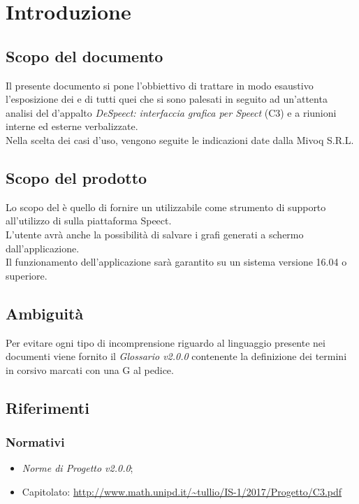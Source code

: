 \documentclass[./AnalisideiRequisiti.tex]{subfiles}
\begin{document}
	
\chapter{Introduzione}
\section{Scopo del documento}
Il presente documento si pone l’obbiettivo di trattare in modo esaustivo l’esposizione dei  e di tutti quei  che si sono palesati in seguito ad un’attenta analisi del  d’appalto \textit{DeSpeect: interfaccia grafica per Speect} (C3) e a riunioni interne ed esterne verbalizzate.
\\ \noindent Nella scelta dei casi d'uso, vengono seguite le indicazioni date dalla  Mivoq S.R.L.

\section{Scopo del prodotto}

Lo scopo del  è quello di fornire un  utilizzabile come strumento di supporto all'utilizzo di  sulla piattaforma Speect. 
\\ \noindent L'utente avrà anche la possibilità di salvare i grafi generati a schermo dall'applicazione.
\\ \noindent Il funzionamento dell'applicazione sarà garantito su un sistema  versione 16.04 o superiore.

\section{Ambiguità}
Per evitare ogni tipo di incomprensione riguardo al linguaggio presente nei documenti viene fornito il \textit{Glossario v2.0.0} contenente la definizione dei termini in corsivo marcati con una G al pedice.

\section{Riferimenti}
\subsection*{Normativi}
\begin{itemize}
	\item \textit{Norme di Progetto v2.0.0};
	\item Capitolato: \url{http://www.math.unipd.it/~tullio/IS-1/2017/Progetto/C3.pdf}
\end{itemize}
\end{document}
